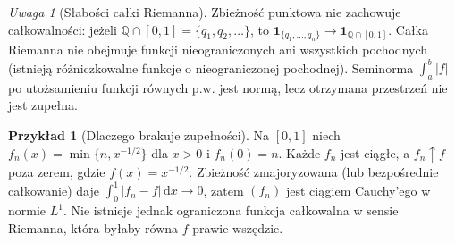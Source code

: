 \documentclass[11pt,a4paper]{article}
\numberwithin{equation}{section}
\theoremstyle{plain}
\theoremstyle{definition}
\newtheorem{przyklad}[twierdzenie]{Przykład}
\theoremstyle{remark}
\newtheorem{uwaga}[twierdzenie]{Uwaga}
\newcommand{\Q}{\mathbb Q}
\newcommand{\ind}[1]{\mathbf 1_{#1}}
\begin{document}
\begin{uwaga}[Słabości całki Riemanna]
Zbieżność punktowa nie zachowuje całkowalności: jeżeli $\Q\cap[0,1]=\{q_1,q_2,\dots\}$, to $\ind{\{q_1,\dots,q_n\}}\to\ind{\Q\cap[0,1]}$. Całka Riemanna nie obejmuje funkcji nieograniczonych ani wszystkich pochodnych (istnieją różniczkowalne funkcje o nieograniczonej pochodnej). Seminorma $\int_a^b|f|$ po utożsamieniu funkcji równych p.w. jest normą, lecz otrzymana przestrzeń nie jest zupełna.
\end{uwaga}
\begin{przyklad}[Dlaczego brakuje zupełności]
Na $[0,1]$ niech $f_n(x)=\min\{n,x^{-1/2}\}$ dla $x>0$ i $f_n(0)=n$. Każde $f_n$ jest ciągłe, a $f_n\uparrow f$ poza zerem, gdzie $f(x)=x^{-1/2}$. Zbieżność zmajoryzowana (lub bezpośrednie całkowanie) daje $\int_0^1|f_n-f|\,\mathrm dx\to0$, zatem $(f_n)$ jest ciągiem Cauchy'ego w normie $L^1$. Nie istnieje jednak ograniczona funkcja całkowalna w sensie Riemanna, która byłaby równa $f$ prawie wszędzie.
\end{przyklad}
\end{document}
